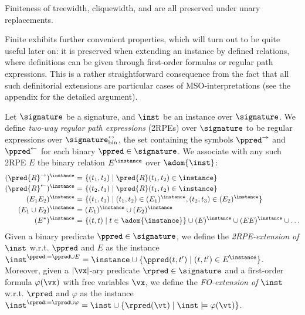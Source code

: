 \begin{observation}\label{prop:unary-replacements}
Finiteness of treewidth, cliquewidth, and \hypercliquewidth{} are all preserved under unary replacements. 
\end{observation}

Finite \hypercliquewidth{} exhibits further convenient properties, which will turn out to be quite useful later on: it is preserved when extending an instance by defined relations, where definitions can be given through first-order formulas or regular path expressions. This is a rather straightforward consequence from the fact that all such definitorial extensions are particular cases of MSO-interpretations (see the appendix for the detailed argument).

\begin{definition}\label{def:extensions}
Let $\signature$ be a signature, and $\inst$ be an instance over $\signature$. 
We define \emph{two-way regular path expressions} (2RPEs) over $\signature$ to be regular expressions over $\signature_{\smash{\mathrm{bin}}}^\leftrightarrow$, the set containing the symbols $\ppred^\rightarrow$ and $\ppred^\leftarrow$ for each binary $\ppred\in \signature$.
We associate with any such 2RPE $E$
the binary relation $E^\instance$ over $\adom{\inst}$:
\begin{align*}
	(\pred{R}^\rightarrow)^\instance = &\ \{(t_1,t_2) \mid \pred{R}(t_1,t_2) \in \instance\} \\[-0.5ex]
	(\pred{R}^\leftarrow)^\instance = &\  \{(t_2,t_1) \mid \pred{R}(t_1,t_2) \in \instance\} \\[-0.5ex]
	(E_1E_2)^\instance = &\  \{(t_1,t_3) \mid (t_1,t_2)\in (E_1)^\instance, (t_2,t_3)\in (E_2)^\instance\}  \\[-0.5ex]
	(E_1 \cup E_2)^\instance = &\  (E_1)^\instance \cup (E_2)^\instance \\[-0.5ex]
	(E^*)^\instance = &\  \{(t,t) \mid t \in \adom{\instance}\} \cup (E)^\instance \cup (EE)^\instance \cup \ldots
\end{align*}
%
Given a binary predicate $\ppred \in \signature$, we define the \emph{2RPE-extension of $\inst$} w.r.t. $\ppred$ and $E$ as the instance $\inst^{\ppred:=\ppred\cup E} = \instance \cup \{\ppred(t,t') \mid (t,t')\in E^\instance \}$.  
%
Moreover, given a $|\vx|$-ary predicate $\rpred \in \signature$ and a first-or\-der formula $\varphi(\vx)$ with free variables $\vx$, we define the \emph{FO-extension of $\inst$} w.r.t. $\rpred$ and $\varphi$ as the instance $\inst^{\rpred:=\rpred\cup\varphi} = \inst \cup \{\rpred(\vt) \mid \inst \models \varphi(\vt)\}$.  
\end{definition} 

